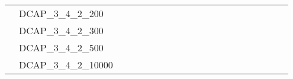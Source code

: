 \begin{table}[]
{\begin{tabular}{|c|l|lll|lll|lllll|llll|lll|}
			& DCAP\_3\_4\_2\_200            &                          &                         &                          &                          &                         &                          &                          &                         &                         &                          &                           &                             &                             &                             &                               &                          &                          &                           \\
			& DCAP\_3\_4\_2\_300            &                          &                         &                          &                          &                         &                          &                          &                         &                         &                          &                           &                             &                             &                             &                               &                          &                          &                           \\
			& DCAP\_3\_4\_2\_500            &                          &                         &                          &                          &                         &                          &                          &                         &                         &                          &                           &                             &                             &                             &                               &                          &                          &                           \\
			& DCAP\_3\_4\_2\_10000          &                          &                         &                          &                          &                         &                          &                          &                         &                         &                          &                           &                             &                             &                             &                               &                          &                          &                           \\ \hline
		\end{tabular}%
	}
\end{table}
